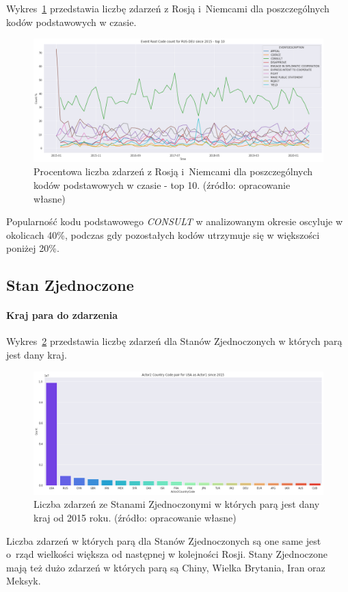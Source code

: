 \documentclass[11pt]{report}
\begin{document}
    Wykres~\ref{fig:RUSRUSERC} przedstawia liczbę zdarzeń z Rosją i~Niemcami dla poszczególnych kodów podstawowych w czasie.
    \begin{figure}[!htp]
        \centering
        \includegraphics[width=\linewidth]{fig/RUS/RUSDEUERCperc.png}
        \caption{Procentowa liczba zdarzeń z Rosją i~Niemcami dla poszczególnych kodów podstawowych w czasie - top 10. (źródło: opracowanie własne)}
        \label{fig:RUSRUSERC}
    \end{figure}
    Popularność kodu podstawowego \textit{CONSULT} w analizowanym okresie oscyluje w okolicach 40\%, podczas gdy pozostałych kodów utrzymuje się w większości poniżej 20\%.

    \subsection{Stan Zjednoczone}

    \paragraph{Kraj para do zdarzenia}

    Wykres~\ref{fig:USApair} przedstawia liczbę zdarzeń dla Stanów Zjednoczonych w których parą jest dany kraj.

    \begin{figure}[!htp]
        \centering
        \includegraphics[width=\linewidth]{fig/USA/USAactor2Pair.png}
        \caption{Liczba zdarzeń ze Stanami Zjednoczonymi w których parą jest dany kraj od 2015 roku. (źródło: opracowanie własne)}
        \label{fig:USApair}
    \end{figure}
    Liczba zdarzeń w których parą dla Stanów Zjednoczonych są one same jest o~rząd wielkości większa od następnej w kolejności Rosji.
    Stany Zjednoczone mają też dużo zdarzeń w których parą są Chiny, Wielka Brytania, Iran oraz Meksyk.
\end{document}
